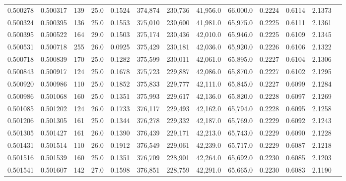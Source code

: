 \begin{tabular}{rrrrrrrrrrrrr}
0.500278 & 0.500317 &   139 & 25.0 &                                     0.1524 & 374,874 & 230,736 &  41,956.0 &  66,000.0 & 0.2224 & 0.6114 & 2.1373 \\
0.500324 & 0.500395 &   136 & 25.0 &                                     0.1553 & 375,010 & 230,600 &  41,981.0 &  65,975.0 & 0.2225 & 0.6111 & 2.1361 \\
0.500395 & 0.500522 &   164 & 29.0 &                                     0.1503 & 375,174 & 230,436 &  42,010.0 &  65,946.0 & 0.2225 & 0.6109 & 2.1345 \\
0.500531 & 0.500718 &   255 & 26.0 &                                     0.0925 & 375,429 & 230,181 &  42,036.0 &  65,920.0 & 0.2226 & 0.6106 & 2.1322 \\
0.500718 & 0.500839 &   170 & 25.0 &                                     0.1282 & 375,599 & 230,011 &  42,061.0 &  65,895.0 & 0.2227 & 0.6104 & 2.1306 \\
0.500843 & 0.500917 &   124 & 25.0 &                                     0.1678 & 375,723 & 229,887 &  42,086.0 &  65,870.0 & 0.2227 & 0.6102 & 2.1295 \\
0.500920 & 0.500986 &   110 & 25.0 &                                     0.1852 & 375,833 & 229,777 &  42,111.0 &  65,845.0 & 0.2227 & 0.6099 & 2.1284 \\
0.500986 & 0.501068 &   160 & 25.0 &                                     0.1351 & 375,993 & 229,617 &  42,136.0 &  65,820.0 & 0.2228 & 0.6097 & 2.1269 \\
0.501085 & 0.501202 &   124 & 26.0 &                                     0.1733 & 376,117 & 229,493 &  42,162.0 &  65,794.0 & 0.2228 & 0.6095 & 2.1258 \\
0.501206 & 0.501305 &   161 & 25.0 &                                     0.1344 & 376,278 & 229,332 &  42,187.0 &  65,769.0 & 0.2229 & 0.6092 & 2.1243 \\
0.501305 & 0.501427 &   161 & 26.0 &                                     0.1390 & 376,439 & 229,171 &  42,213.0 &  65,743.0 & 0.2229 & 0.6090 & 2.1228 \\
0.501431 & 0.501514 &   110 & 26.0 &                                     0.1912 & 376,549 & 229,061 &  42,239.0 &  65,717.0 & 0.2229 & 0.6087 & 2.1218 \\
0.501516 & 0.501539 &   160 & 25.0 &                                     0.1351 & 376,709 & 228,901 &  42,264.0 &  65,692.0 & 0.2230 & 0.6085 & 2.1203 \\
0.501541 & 0.501607 &   142 & 27.0 &                                     0.1598 & 376,851 & 228,759 &  42,291.0 &  65,665.0 & 0.2230 & 0.6083 & 2.1190 \\

\end{tabular}
